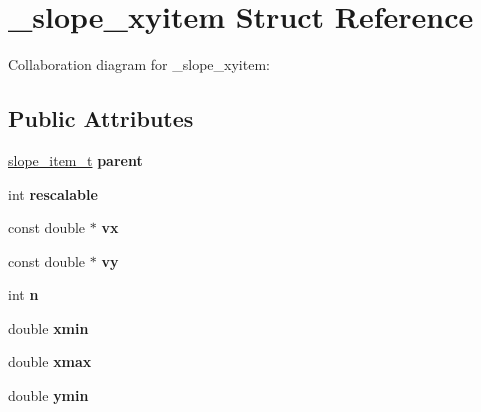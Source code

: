 \hypertarget{struct__slope__xyitem}{\section{\+\_\+slope\+\_\+xyitem Struct Reference}
\label{struct__slope__xyitem}
}


Collaboration diagram for \+\_\+slope\+\_\+xyitem\+:
\subsection*{Public Attributes}
\begin{DoxyCompactItemize}
\item 
\hypertarget{struct__slope__xyitem_a84f281e8c4ec73ed02f8b85e594319b6}{\hyperlink{group__Item_ga2616141f0e164a876049da51ea3a8646}{slope\+\_\+item\+\_\+t} {\bfseries parent}}\label{struct__slope__xyitem_a84f281e8c4ec73ed02f8b85e594319b6}

\item 
\hypertarget{struct__slope__xyitem_a5b9268cd9e371fcd22002ebed979bb8a}{int {\bfseries rescalable}}\label{struct__slope__xyitem_a5b9268cd9e371fcd22002ebed979bb8a}

\item 
\hypertarget{struct__slope__xyitem_ae1493e872601ce918c5874e187a55a3c}{const double $\ast$ {\bfseries vx}}\label{struct__slope__xyitem_ae1493e872601ce918c5874e187a55a3c}

\item 
\hypertarget{struct__slope__xyitem_a133d040cfe16cf85e26568e5213cb950}{const double $\ast$ {\bfseries vy}}\label{struct__slope__xyitem_a133d040cfe16cf85e26568e5213cb950}

\item 
\hypertarget{struct__slope__xyitem_a77d380f8d9d0700bb2349d256e36a2b4}{int {\bfseries n}}\label{struct__slope__xyitem_a77d380f8d9d0700bb2349d256e36a2b4}

\item 
\hypertarget{struct__slope__xyitem_a7d2cb6e80d6d6ce215e871a72349e570}{double {\bfseries xmin}}\label{struct__slope__xyitem_a7d2cb6e80d6d6ce215e871a72349e570}

\item 
\hypertarget{struct__slope__xyitem_a920a8c4003cf2648a92b38cae4a2230b}{double {\bfseries xmax}}\label{struct__slope__xyitem_a920a8c4003cf2648a92b38cae4a2230b}

\item 
\hypertarget{struct__slope__xyitem_a2fde7ba32d219624978c2b5efbb0ae24}{double {\bfseries ymin}}\label{struct__slope__xyitem_a2fde7ba32d219624978c2b5efbb0ae24}


\end{DoxyCompactItemize}
